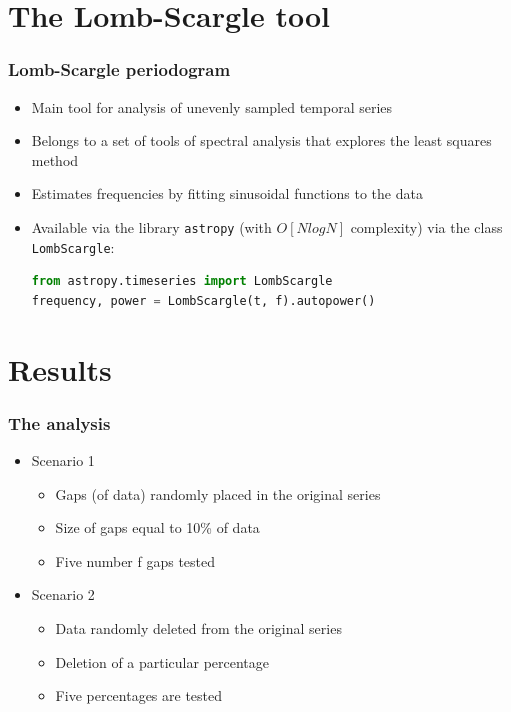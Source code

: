 \documentclass{beamer}
\begin{document}
\section{The Lomb-Scargle tool}

\begin{frame}[fragile]
\frametitle{Lomb-Scargle periodogram}
\begin{itemize}
\item Main tool for analysis of unevenly sampled temporal series 
\item Belongs to a set of tools of spectral analysis that explores the least squares method
\item Estimates frequencies by fitting sinusoidal functions to the data
\item Available via the library \texttt{astropy} (with $O[NlogN]$ complexity) via the class \texttt{LombScargle}:
\begin{lstlisting}[language=python,style=mystyle2]
from astropy.timeseries import LombScargle
frequency, power = LombScargle(t, f).autopower()
\end{lstlisting}
\end{itemize}
\end{frame}

\section{Results}

\begin{frame}
\frametitle{The analysis}
\begin{itemize}
\item Scenario 1
\begin{itemize}
\item Gaps (of data) randomly placed in the original series
\item Size of gaps equal to 10\% of data
\item Five number f gaps tested
\end{itemize}
\item Scenario 2
\begin{itemize}
\item Data randomly deleted from the original series
\item Deletion of a particular percentage 
\item Five percentages are tested
\end{itemize}
\end{itemize}
\end{frame}
\end{document}
